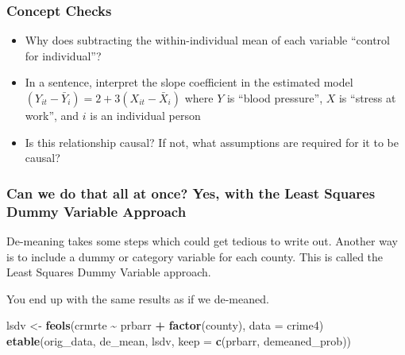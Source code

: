 \documentclass[
]{article}
\newenvironment{Shaded}{\begin{snugshade}}{\end{snugshade}}
\newcommand{\AttributeTok}[1]{\textcolor[rgb]{0.13,0.29,0.53}{#1}}
\newcommand{\FunctionTok}[1]{\textcolor[rgb]{0.13,0.29,0.53}{\textbf{#1}}}
\newcommand{\NormalTok}[1]{#1}
\newcommand{\OtherTok}[1]{\textcolor[rgb]{0.56,0.35,0.01}{#1}}
\newcommand{\SpecialCharTok}[1]{\textcolor[rgb]{0.81,0.36,0.00}{\textbf{#1}}}
\newcommand{\StringTok}[1]{\textcolor[rgb]{0.31,0.60,0.02}{#1}}
\providecommand{\tightlist}{%
  \setlength{\itemsep}{0pt}\setlength{\parskip}{0pt}}
\begin{document}
\hypertarget{concept-checks}{%
\subsubsection{Concept Checks}\label{concept-checks}}

\begin{itemize}
\tightlist
\item
  Why does subtracting the within-individual mean of each variable
  ``control for individual''?
\item
  In a sentence, interpret the slope coefficient in the estimated model
  \((Y_{it} - \bar{Y}_i) = 2 + 3(X_{it} - \bar{X}_i)\) where \(Y\) is
  ``blood pressure'', \(X\) is ``stress at work'', and \(i\) is an
  individual person
\item
  Is this relationship causal? If not, what assumptions are required for
  it to be causal?
\end{itemize}

\hypertarget{can-we-do-that-all-at-once-yes-with-the-least-squares-dummy-variable-approach}{%
\subsubsection{Can we do that all at once? Yes, with the Least Squares
Dummy Variable
Approach}\label{can-we-do-that-all-at-once-yes-with-the-least-squares-dummy-variable-approach}}

De-meaning takes some steps which could get tedious to write out.
Another way is to include a dummy or category variable for each county.
This is called the Least Squares Dummy Variable approach.

You end up with the same results as if we de-meaned.

\begin{Shaded}
\begin{Highlighting}[]
\NormalTok{lsdv }\OtherTok{\textless{}{-}} \FunctionTok{feols}\NormalTok{(crmrte }\SpecialCharTok{\textasciitilde{}}\NormalTok{ prbarr }\SpecialCharTok{+} \FunctionTok{factor}\NormalTok{(county), }\AttributeTok{data =}\NormalTok{ crime4)}
\FunctionTok{etable}\NormalTok{(orig\_data, de\_mean, lsdv, }\AttributeTok{keep =} \FunctionTok{c}\NormalTok{(}\StringTok{\textquotesingle{}prbarr\textquotesingle{}}\NormalTok{, }\StringTok{\textquotesingle{}demeaned\_prob\textquotesingle{}}\NormalTok{))}
\end{Highlighting}
\end{Shaded}
\end{document}
